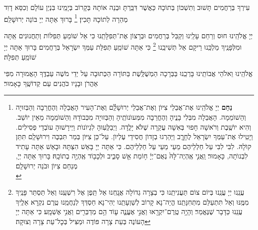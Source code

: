\documentclass[twoside, openany, parskip=half, 11pt]{book}
\begin{document}
עִירְךָ בְּרַחֲמִים תָּשׁוּב וְתִשְׁכּוֹן בְּתוֹכָהּ כַּאֲשֶׁר דִּבַּֽרְתָּ וּבְנֵה אוֹתָהּ בְּקָרוֹב בְּיָמֵֽינוּ בִּנְיַן עוֹלָם וְכִסֵּא דָוִד מְהֵרָה לְתוֹכָהּ תָּכִין׃
\footnote{
\textbf{נַחֵם}
יְיָ אֱלֹהֵֽינוּ אֶת־אֲבֵלֵי צִיּוֺן וְאֶת־אֲבֵלֵי יְרוּשָׁלַֽ֔֗͏ִם וְאֶת־הָעִיר הָאֲבֵלָה וְהֶחֳרֵבָה וְהַבְּזוּיָה וְהַשׁוֺמֵמָה. הָאֲבֵלָה מִבְּלִי בָנֱיהָ וְהֶחֳרֵבָה מִמְּעוֺנוֺתֶֽיהָ וְהַבְּזוּיָה מִכְּבוֺדָהּ וְהַשׁוֺמֵמָה מֵאֵין יוֺשֵׁב. וְהִיא יוֺשֶֽׁבֶת וְרֹאשָׁה חָפוּי בְּאִשָׁה עֲקַרָה שֶׁלֹּא יָלֳדָה. וַיְבַלְְּעֽוּהָ לִגְיוֺנוֺת וַיְּירָשׁוּהָ עוֺבְדֵי פְסִילִים. וַיָטִֽילוּ אֶת־עַמְּךָ יִשְׂרָאֵל לֶחָרֱֽב וַיַּהַרְגוּ בְזָדוֺן חֲסִידֵי עֶלְיוֺן. עַל־כֵּן צִיּוֺן בְּמַר תִּבְכֶּה וִירוּשָׁלַֽ͏ִם תִּתֵּן קוֺלָהּ. לִבִּי לִבִּי עַל חַלְלֵיהֶם מֵעַי מֵעַי עַל חַלְלֵיהֶם. כִּי אַתָּה יְיָ בָּאֵשׁ הִצַּתָּהּ וּבָאֵשׁ אַתָּה עָתִיד לִבְנוֺתָה, כָּאָמוּר׃
%
וַֽאֲנִ֤י אֶֽהְיֶה־לָּהּ֙ נְאֻם־יְיָ֔ ח֥וֹמַת אֵ֖שׁ סָבִ֑יב וּלְכָב֖וֹד אֶֽהְיֶ֥ה בְתוֹכָֽהּ׃
בָּרוּךְ אַתָּה יְיָ, מְנַחֵם צִיוֺן וּבֹנֵה יְרוּשָׁלַֽ͏ִם׃ \\
}
בָּרוּךְ אַתָּה יְיָ בּוֹנֵה יְרוּשָׁלַ‍ִם׃

\weekdaysamalchus

יְיָ אֱלֹהֵֽינוּ חוּס וְרַחֵם עָלֵֽינוּ וְקַבֵּל בְּרַחֲמִים וּבְרָצוֹן אֶת־תְּפִלָּתֵֽנוּ כִּי אֵל שׁוֹמֵעַ תְּפִלּוֹת וְתַחֲנוּנִים אַֽתָּה וּמִלְּפָנֶֽיךָ מַלְכֵּֽנוּ רֵיקָם אַל תְּשִׁיבֵֽנוּ
\footnote{
עֲנֵֽנוּ יְיָ עֲנֵֽנוּ בְּיוֹם צוֹם תַּעֲנִיתֵֽנוּ כִּי בְצָרָה גְדוֹלָה אֲנָֽחְנוּ אַל תֵּֽפֶן אֶל רִשְׁעֵֽנוּ וְאַל תַּסְתֵּר פָּנֶֽיךָ מִמֶּֽנּוּ וְאַל תִּתְעַלַּם מִתְּחִנָּתֵֽנוּ׃ הֱיֵה־נָא קָרוֹב לְשַׁוְעָתֵֽנוּ יְהִי־נָא חַסְדְּךָ לְנַחֲמֵֽנוּ טֶֽרֶם נִקְרָא אֵלֶֽיךָ עֲנֵֽנוּ כַּדָּבָר שֶׁנֶּאֱמַר׃
%
וְהָיָ֥ה טֶֽרֶם־יִקְרָ֖אוּ וַאֲנִ֣י אֶעֱנֶ֑ה ע֛וֹד הֵ֥ם מְדַבְּרִ֖ים וַאֲנִ֥י אֶשְׁמָֽע׃ כִּי אַתָּה יְיָ הָעוֹנֶה בְּעֵת צָרָה פּוֹדֶה וּמַצִּיל בְּכׇל־עֵת צָרָה וְצוּקָה׃
}
כִּי אַתָּה שׁוֹמֵֽעַ תְּפִלַּת עַמְּךָ יִשְׂרָאֵל בְּרַחֲמִים׃ בָּרוּךְ אַתָּה יְיָ שׁוֹמֵֽעַ תְּפִלָּה׃

\retzeh

\yaalehveyavo

\zion

\modim

\alhanisim

\weekdaysahodos

אֱלֹהֵֽינוּ וֵאלֹהֵי אֲבוֹתֵֽינוּ בָּרְכֵֽנוּ בַּבְּרָכָה הַמְשֻׁלֶּֽשֶׁת בַּתּוֹרָה
הַכְּתוּבָה עַל יְדֵי מֹשֶׁה עַבְדֶּֽךָ הָאֲמוּרָה מִפִּי אַהֲרֹן וּבָנָיו כֹּהֲנִים עַם קְדוֹשֶֽׁךָ כָּאָמוּר׃
\end{document}
